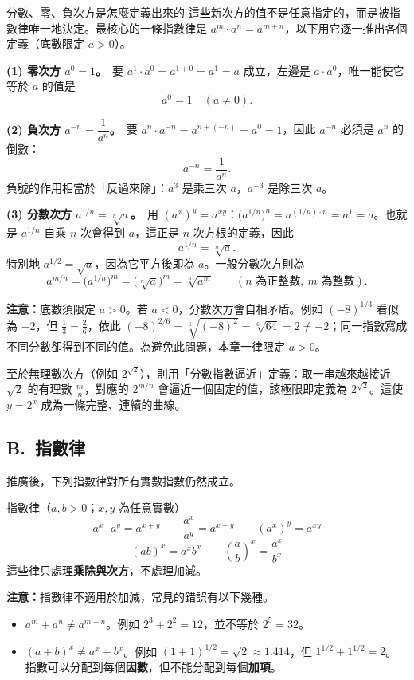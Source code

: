 \documentclass[11pt]{article}
\begin{document}
\begin{補充框}{分數、零、負次方是怎麼定義出來的}
這些新次方的值不是任意指定的，而是被指數律唯一地決定。最核心的一條指數律是 $a^m\cdot a^n=a^{m+n}$，以下用它逐一推出各個定義（底數限定 $a>0$）。

\textbf{(1) 零次方 $a^0=1$。}\ 要 $a^1\cdot a^0=a^{1+0}=a^1=a$ 成立，左邊是 $a\cdot a^0$，唯一能使它等於 $a$ 的值是
$$a^0=1\quad(a\ne0).$$

\textbf{(2) 負次方 $a^{-n}=\dfrac{1}{a^n}$。}\ 要 $a^n\cdot a^{-n}=a^{n+(-n)}=a^0=1$，因此 $a^{-n}$ 必須是 $a^n$ 的倒數：
$$a^{-n}=\frac{1}{a^n}.$$
負號的作用相當於「反過來除」：$a^3$ 是乘三次 $a$，$a^{-3}$ 是除三次 $a$。

\textbf{(3) 分數次方 $a^{1/n}=\sqrt[n]{a}$。}\ 用 $(a^x)^y=a^{xy}$：$\big(a^{1/n}\big)^n=a^{(1/n)\cdot n}=a^1=a$。也就是 $a^{1/n}$ 自乘 $n$ 次會得到 $a$，這正是 $n$ 次方根的定義，因此
$$a^{1/n}=\sqrt[n]{a}.$$
特別地 $a^{1/2}=\sqrt a$，因為它平方後即為 $a$。一般分數次方則為
$$a^{m/n}=\big(a^{1/n}\big)^m=\big(\sqrt[n]{a}\big)^m=\sqrt[n]{a^m}\qquad(n\text{ 為正整數},\ m\text{ 為整數}).$$

\textbf{注意：}底數須限定 $a>0$。若 $a<0$，分數次方會自相矛盾。例如 $(-8)^{1/3}$ 看似為 $-2$，但 $\tfrac13=\tfrac26$，依此 $(-8)^{2/6}=\sqrt[6]{(-8)^2}=\sqrt[6]{64}=2\ne-2$；同一指數寫成不同分數卻得到不同的值。為避免此問題，本章一律限定 $a>0$。
\end{補充框}

至於無理數次方（例如 $2^{\sqrt2}$），則用「分數指數逼近」定義：取一串越來越接近 $\sqrt2$ 的有理數 $\frac{m}{n}$，對應的 $2^{m/n}$ 會逼近一個固定的值，該極限即定義為 $2^{\sqrt2}$。這使 $y=2^x$ 成為一條完整、連續的曲線。

\subsection*{\sffamily B.\ 指數律}

推廣後，下列指數律對所有實數指數仍然成立。

\begin{補充框}{指數律（$a,b>0$；$x,y$ 為任意實數）}
$$a^x\cdot a^y=a^{x+y}\qquad \frac{a^x}{a^y}=a^{x-y}\qquad (a^x)^y=a^{xy}$$
$$(ab)^x=a^x b^x\qquad \left(\frac{a}{b}\right)^x=\frac{a^x}{b^x}$$
這些律只處理\textbf{乘除與次方}，不處理加減。
\end{補充框}

\textbf{注意：}指數律不適用於加減，常見的錯誤有以下幾種。

\begin{itemize}\setlength{\itemsep}{1pt}
\item $a^{m}+a^{n}\ne a^{m+n}$。例如 $2^3+2^2=12$，並不等於 $2^5=32$。
\item $(a+b)^x\ne a^x+b^x$。例如 $(1+1)^{1/2}=\sqrt2\approx1.414$，但 $1^{1/2}+1^{1/2}=2$。指數可以分配到每個\textbf{因數}，但不能分配到每個\textbf{加項}。
\end{itemize}
\end{document}
